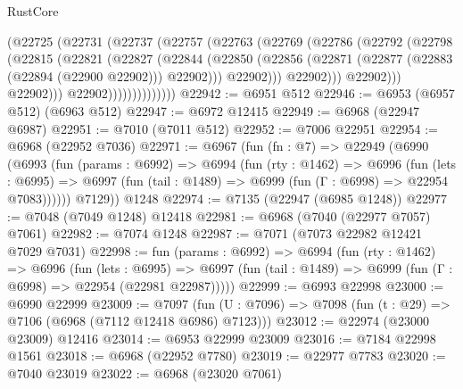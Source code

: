 \begin{lexlean}{RustCore}
\begin{coremodule}
                            (@22725
                              (@22731
                                (@22737
                                  (@22757
                                    (@22763
                                      (@22769
                                        (@22786
                                          (@22792
                                            (@22798
                                              (@22815
                                                (@22821
                                                  (@22827
                                                    (@22844
                                                      (@22850
                                                        (@22856
                                                          (@22871
                                                            (@22877
                                                              (@22883 (@22894 (@22900 @22902)))
                                                              @22902)))
                                                        @22902)))
                                                  @22902)))
                                            @22902)))
                                      @22902)))
                                @22902))))))))))))))
@22942 := @6951 @512
@22946 := @6953 (@6957 @512) (@6963 @512)
@22947 := @6972 @12415
@22949 := @6968 (@22947 @6987)
@22951 := @7010 (@7011 @512)
@22952 := @7006 @22951
@22954 := @6968 (@22952 @7036)
@22971 := @6967
    (fun (fn : @7) =>
    @22949
      (@6990
        (@6993
          (fun (params : @6992) =>
          @6994
            (fun (rty : @1462) =>
            @6996
              (fun (lets : @6995) =>
              @6997 (fun (tail : @1489) => @6999 (fun (Γ : @6998) => @22954 @7083))))))
        @7129))
    @1248
@22974 := @7135 (@22947 (@6985 @1248))
@22977 := @7048 (@7049 @1248) @12418
@22981 := @6968 (@7040 (@22977 @7057) @7061)
@22982 := @7074 @1248
@22987 := @7071 (@7073 @22982 @12421 @7029 @7031)
@22998 := fun (params : @6992) =>
  @6994
    (fun (rty : @1462) =>
    @6996
      (fun (lets : @6995) =>
      @6997 (fun (tail : @1489) => @6999 (fun (Γ : @6998) => @22954 (@22981 @22987)))))
@22999 := @6993 @22998
@23000 := @6990 @22999
@23009 := @7097
    (fun (U : @7096) => @7098 (fun (t : @29) => @7106 (@6968 (@7112 @12418 @6986) @7123)))
@23012 := @22974 (@23000 @23009) @12416
@23014 := @6953 @22999 @23009
@23016 := @7184 @22998 @1561
@23018 := @6968 (@22952 @7780)
@23019 := @22977 @7783
@23020 := @7040 @23019
@23022 := @6968 (@23020 @7061)

\end{coremodule}
\end{lexlean}
